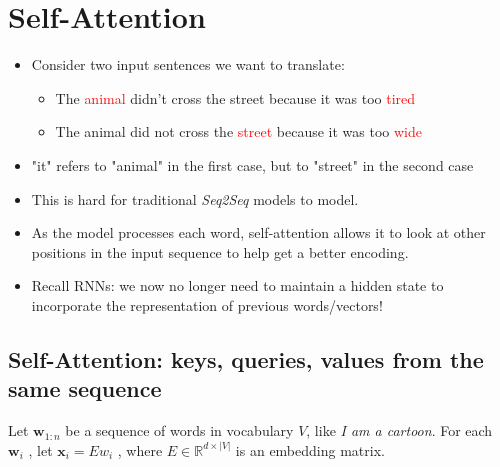 \documentclass{article}
\begin{document}
\section{Self-Attention}
\begin{itemize}
    \item Consider two input sentences we want to translate:
    \begin{itemize}
        \item The \textcolor{red}{animal} didn't cross the street because it was too \textcolor{red}{tired}
        \item The animal did not cross the  \textcolor{red}{street} because it was too \textcolor{red}{wide}
    \end{itemize}
    \item "it" refers to "animal" in the first case, but to "street" in the second case
    \item This is hard for traditional \textit{Seq2Seq} models to model.
    \item As the model processes each word, self-attention allows it to look at other positions in the input sequence to help get a better encoding. 
    \item Recall RNNs: we now no longer need to maintain a hidden state to incorporate the representation of previous words/vectors!
\end{itemize}
\subsection{Self-Attention: keys, queries, values from the same sequence}
Let $\textbf{w}_{1:n}$ be a sequence of words in vocabulary $V$, like \textit{I am a cartoon}. For each $\textbf{w}_i$ , let $\textbf{x}_i = E w_i$ , where $E \in \mathbb{R}^{d \times |V|}$ is an embedding matrix.  \\
\end{document}
